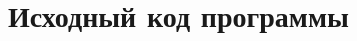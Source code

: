 \documentclass[12pt, a4paper]{article}
\newcommand{\inputTableConvergence}[1]{
\noindent{\scriptsize\pgfplotstabletypeset[
	columns={i, nodes, iters, norm},
	columns/i/.style={string type},
	columns/nodes/.style={string type},
	columns/iters/.style={string type},
	columns/norm/.style={string type, column type/.add={}{|},},
	every head row/.style={before row=\hline,after row=\hline}, 
	every last row/.style={after row=\hline},
	column type/.add={|},
	col sep=tab,
]{#1}}
}
\newcommand{\inputTableConvergencecopy}[1]{
\[\begin{tabular}{ | с | с | с | m{11em}  m{8em} m{8em} }
	\hline
	\backslashbox{время}{пространство} & равномерное & не равномерное \\ \hline
	равномерное & \inputTableConvergence{#1.11.txt} & \inputTableConvergence{#1.01.txt} \\ \hline
	не равномерное & \inputTableConvergence{#1.10.txt} & \inputTableConvergence{#1.00.txt} \\
	\hline
\end{tabular}\]
}
\newcommand{\myCodeInput}[3]{
{\bf #2}

}
\begin{document}
%
%
%
%



\section{Исходный код программы}
%
%
%
%
\end{document}
